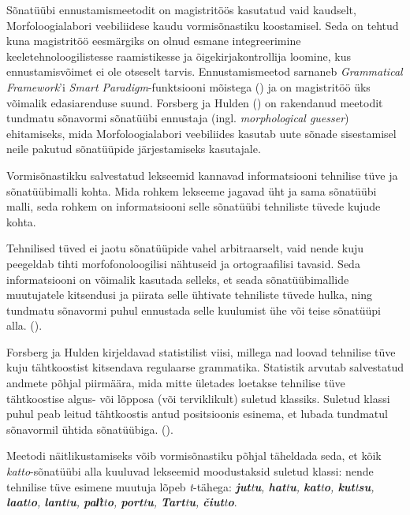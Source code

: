\documentclass[12pt,a4paper]{article}
\newcommand{\vadja}[1]{\textit{#1}}
\begin{document}
Sõnatüübi ennustamismeetodit on magistritöös kasutatud vaid kaudselt, Morfoloogialabori veebiliidese kaudu vormisõnastiku koostamisel. Seda on tehtud kuna magistritöö eesmärgiks on olnud esmane integreerimine keeletehnoloogilistesse raamistikesse ja õigekirjakontrollija loomine, kus ennustamisvõimet ei ole otseselt tarvis. Ennustamismeetod sarnaneb \textit{Grammatical Framework}'i \textit{Smart Paradigm}-funktsiooni mõistega (\cite{detrez_smart_2012}) ja on magistritöö üks võimalik edasiarenduse suund. Forsberg ja Hulden (\cite{forsberg_deriving_2016}) on rakendanud meetodit tundmatu sõnavormi sõnatüübi ennustaja (ingl. \textit{morphological guesser}) ehitamiseks, mida Morfoloogialabori veebiliides kasutab uute sõnade sisestamisel neile pakutud sõnatüüpide järjestamiseks kasutajale.

Vormisõnastikku salvestatud lekseemid kannavad informatsiooni tehnilise tüve ja sõnatüübimalli kohta. Mida rohkem lekseeme jagavad üht ja sama sõnatüübi malli, seda rohkem on informatsiooni selle sõnatüübi tehniliste tüvede kujude kohta.

Tehnilised tüved ei jaotu sõnatüüpide vahel arbitraarselt, vaid nende kuju peegeldab tihti morfo\-fonoloogilisi nähtuseid ja orto\-graafilisi tavasid. Seda informatsiooni on võimalik kasutada selleks, et seada sõna\-tüübi\-mallide muutujatele kitsendusi ja piirata selle ühtivate tehniliste tüvede hulka, ning tundmatu sõnavormi puhul ennustada selle kuulumist ühe või teise sõnatüüpi alla. (\cite[2579]{forsberg_deriving_2016}).

Forsberg ja Hulden kirjeldavad statistilist viisi, millega nad loovad tehnilise tüve kuju tähtkoostist kitsendava regulaarse grammatika. Statistik arvutab salvestatud andmete põhjal piirmäära, mida mitte ületades loetakse tehnilise tüve tähtkoostise algus- või lõpposa (või terviklikult) suletud klassiks. Suletud klassi puhul peab leitud tähtkoostis antud positsioonis esinema, et lubada tundmatul sõnavormil ühtida sõnatüübiga. (\cite[2580]{forsberg_deriving_2016}).

Meetodi näitlikustamiseks võib vormisõnastiku põhjal täheldada seda, et kõik \textit{katto}-sõnatüübi alla kuuluvad lekseemid moodustaksid suletud klassi: nende tehnilise tüve esimene muutuja lõpeb \textit{t}-tähega: \vadja{\textbf{jut}t\textbf{u}, \textbf{hat}t\textbf{u}, \textbf{kat}t\textbf{o}, \textbf{kut}t\textbf{su}, \textbf{laat}t\textbf{o}, \textbf{lant}t\textbf{u}, \textbf{pal̕t}t\textbf{o}, \textbf{port}t\textbf{u}, \textbf{Tart}t\textbf{u}, \textbf{čiut}t\textbf{o}}.
\end{document}
